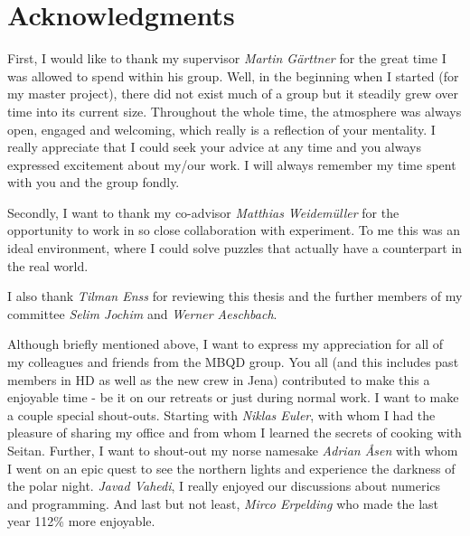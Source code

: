 {}

\bigskip

\begingroup
\let\clearpage\relax
\let\cleardoublepage\relax
\let\cleardoublepage\relax
\chapter*{Acknowledgments}
First, I would like to thank my supervisor \emph{Martin Gärttner} for the great time I was allowed to spend within his group. Well, in the beginning when I started (for my master project), there did not exist much of a group but it steadily grew over time into its current size. Throughout the whole time, the atmosphere was always open, engaged and welcoming, which really is a reflection of your mentality. I really appreciate that I could seek your advice at any time and you always expressed excitement about my/our work. I will always remember my time spent with you and the group fondly.

Secondly, I want to thank my co-advisor \emph{Matthias Weidemüller} for the opportunity to work in so close collaboration with experiment. To me this was an ideal environment, where I could solve puzzles that actually have a counterpart in the real world. %

I also thank \emph{Tilman Enss} for reviewing this thesis and the further members of my committee \emph{Selim Jochim} and \emph{Werner Aeschbach}.

Although briefly mentioned above, I want to express my appreciation for all of my colleagues and friends from the MBQD group. You all (and this includes past members in HD as well as the new crew in Jena) contributed to make this a enjoyable time - be it on our retreats or just during normal work.
I want to make a couple special shout-outs. Starting with \emph{Niklas Euler}, with whom I had the pleasure of sharing my office and from whom I learned the secrets of cooking with Seitan. Further, I want to shout-out my norse namesake \emph{Adrian \AA sen} with whom I went on an epic quest to see the northern lights and experience the darkness of the polar night. \emph{Javad Vahedi}, I really enjoyed our discussions about numerics and programming. And last but not least, \emph{Mirco Erpelding} who made the last year 112\% more enjoyable.

